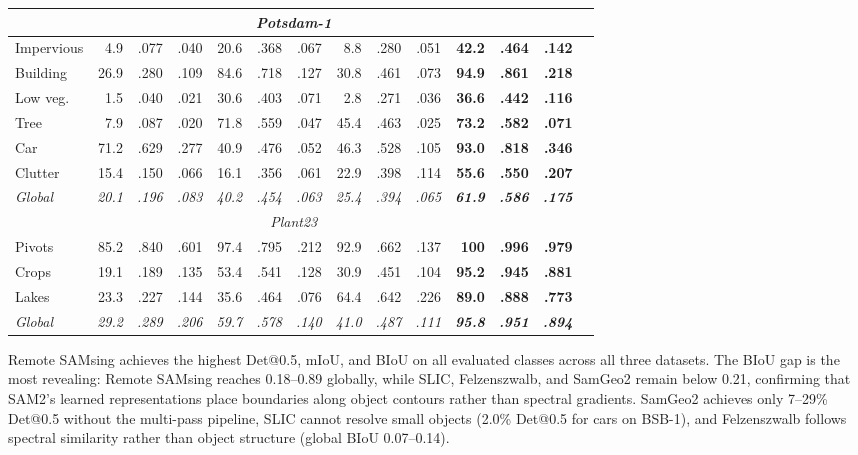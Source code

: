 \documentclass[review,11pt,authoryear]{elsarticle}
\begin{document}
\begin{table}[htbp]
\begin{tabular*}{\textwidth}{@{\extracolsep{\fill}}lrrrrrrrrrrrrr}
\midrule
\multicolumn{13}{c}{\footnotesize\textit{Potsdam-1}} \\
\midrule
Impervious&  4.9 & .077 & .040 & 20.6 & .368 & .067 &  8.8 & .280 & .051 & \textbf{42.2} & \textbf{.464} & \textbf{.142} \\
Building  & 26.9 & .280 & .109 & 84.6 & .718 & .127 & 30.8 & .461 & .073 & \textbf{94.9} & \textbf{.861} & \textbf{.218} \\
Low veg.  &  1.5 & .040 & .021 & 30.6 & .403 & .071 &  2.8 & .271 & .036 & \textbf{36.6} & \textbf{.442} & \textbf{.116} \\
Tree      &  7.9 & .087 & .020 & 71.8 & .559 & .047 & 45.4 & .463 & .025 & \textbf{73.2} & \textbf{.582} & \textbf{.071} \\
Car       & 71.2 & .629 & .277 & 40.9 & .476 & .052 & 46.3 & .528 & .105 & \textbf{93.0} & \textbf{.818} & \textbf{.346} \\
Clutter   & 15.4 & .150 & .066 & 16.1 & .356 & .061 & 22.9 & .398 & .114 & \textbf{55.6} & \textbf{.550} & \textbf{.207} \\
\textit{Global} & \textit{20.1} & \textit{.196} & \textit{.083} & \textit{40.2} & \textit{.454} & \textit{.063} & \textit{25.4} & \textit{.394} & \textit{.065} & \textit{\textbf{61.9}} & \textit{\textbf{.586}} & \textit{\textbf{.175}} \\
\midrule
\multicolumn{13}{c}{\footnotesize\textit{Plant23}} \\
\midrule
Pivots    & 85.2 & .840 & .601 & 97.4 & .795 & .212 & 92.9 & .662 & .137 & \textbf{100} & \textbf{.996} & \textbf{.979} \\
Crops     & 19.1 & .189 & .135 & 53.4 & .541 & .128 & 30.9 & .451 & .104 & \textbf{95.2} & \textbf{.945} & \textbf{.881} \\
Lakes     & 23.3 & .227 & .144 & 35.6 & .464 & .076 & 64.4 & .642 & .226 & \textbf{89.0} & \textbf{.888} & \textbf{.773} \\
\textit{Global} & \textit{29.2} & \textit{.289} & \textit{.206} & \textit{59.7} & \textit{.578} & \textit{.140} & \textit{41.0} & \textit{.487} & \textit{.111} & \textit{\textbf{95.8}} & \textit{\textbf{.951}} & \textit{\textbf{.894}} \\
\bottomrule
\end{tabular*}
\end{table}

Remote SAMsing achieves the highest Det@0.5, mIoU, and BIoU on all evaluated classes across all three datasets. The BIoU gap is the most revealing: Remote SAMsing reaches 0.18--0.89 globally, while SLIC, Felzenszwalb, and SamGeo2 remain below 0.21, confirming that SAM2's learned representations place boundaries along object contours rather than spectral gradients. SamGeo2 achieves only 7--29\% Det@0.5 without the multi-pass pipeline, SLIC cannot resolve small objects (2.0\% Det@0.5 for cars on BSB-1), and Felzenszwalb follows spectral similarity rather than object structure (global BIoU 0.07--0.14).
\end{document}
